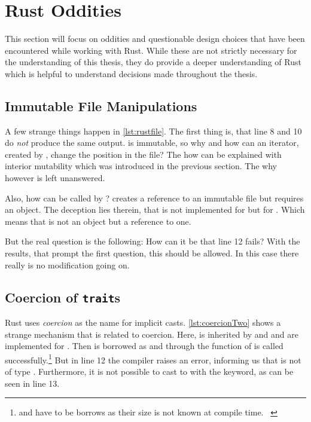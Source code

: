 \documentclass[thesis]{subfiles}
\begin{document}
\section{Rust Oddities}
  This section will focus on oddities and questionable design choices that have been encountered while working with Rust.
  While these are not strictly necessary for the understanding of this thesis, they do provide a deeper understanding of Rust which is helpful to understand decisions made throughout the thesis.

  \subsection{Immutable File Manipulations}
    A few strange things happen in \autoref{lst:rustfile}.
    The first thing is, that line 8 and 10 do \emph{not} produce the same output.
     is immutable, so why and how can an iterator, created by , change the position in the file?
    The how can be explained with interior mutability which was introduced in the previous section.
    The why however is left unanswered.

    Also, how can  be called by ?
     creates a reference to an immutable file but  requires an object.
    The deception lies therein, that \trait \Read is not implemented for \File but for .
    Which means that \self is not an object but a reference to one.

    But the real question is the following: How can it be that line 12 fails?
    With the results, that prompt the first question, this should be allowed.
    In this case there really is no modification going on.


  \subsection{Coercion of \texttt{trait}s}
    Rust uses \emph{coercion} as the name for implicit casts.
    \autoref{lst:coercionTwo} shows a strange mechanism that is related to coercion.
    Here, \A is inherited by \B and \B and \A are implemented for \Foo.
    Then  is borrowed as  and through  the function \fun of \A is called successfully.\footnote{
       and  have to be borrows as their size is not known at compile time.%
      ~\autocite[E0277 referes to 19.4 Advanced Types]{rust-doc}
    }
    But in line 12 the compiler raises an error, informing us that  is not of type \A.
    Furthermore, it is not possible to cast  to  with the  keyword, as can be seen in line 13.
\end{document}
